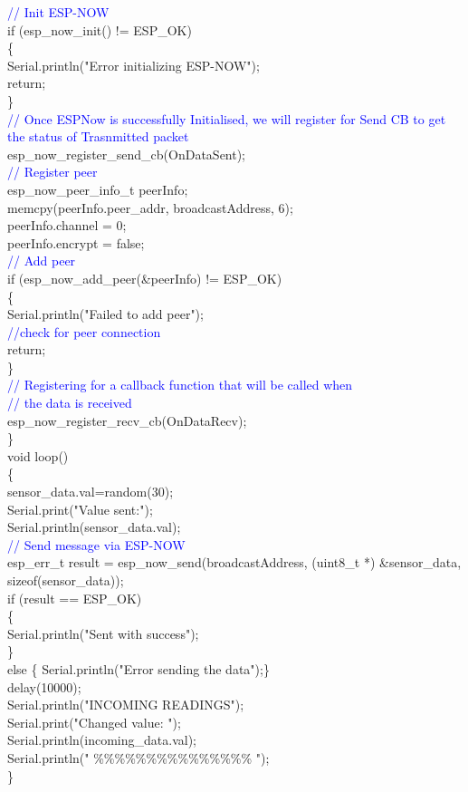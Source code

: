 \documentclass[12pt,a4paper]{article}
\begin{document}
  \textcolor{blue}{// Init ESP-NOW}\\
  if (esp\_now\_init() != ESP\_OK)\\
  \{\\
    Serial.println("Error initializing ESP-NOW");\\
    return;\\
  \}\\
  \textcolor{blue}{// Once ESPNow is successfully Initialised, we will register for Send CB to get the status of Trasnmitted packet}\\
  esp\_now\_register\_send\_cb(OnDataSent);\\
  \textcolor{blue}{// Register peer}\\
  esp\_now\_peer\_info\_t peerInfo;\\
  memcpy(peerInfo.peer\_addr, broadcastAddress, 6);\\
  peerInfo.channel = 0; \\
  peerInfo.encrypt = false;\\
  \textcolor{blue}{// Add peer}\\      
  if (esp\_now\_add\_peer(\&peerInfo) != ESP\_OK)\\
  \{\\ 
    Serial.println("Failed to add peer");\\
    \textcolor{blue}{//check for peer connection}\\
    return;\\
  \}\\
  \textcolor{blue}{// Registering for a callback function that will be called when \\// the data is received}\\
  esp\_now\_register\_recv\_cb(OnDataRecv);\\
\}\\[15pt]
 
void loop() \\
\{\\  
sensor\_data.val=random(30);\\
  Serial.print("Value sent:");\\
  Serial.println(sensor\_data.val);\\
 \textcolor{blue}{ // Send message via ESP-NOW}\\
  esp\_err\_t result = esp\_now\_send(broadcastAddress, (uint8\_t *) \&sensor\_data, sizeof(sensor\_data));\\
   
  if (result == ESP\_OK) \\
  \{\\
    Serial.println("Sent with success");\\
  \}\\
  else \{ Serial.println("Error sending the data");\}\\
  delay(10000);\\
  Serial.println("INCOMING READINGS");\\
  Serial.print("Changed value: ");\\
  Serial.println(incoming\_data.val);\\
  Serial.println(" \%\%\%\%\%\%\%\%\%\%\%\%\%\%\% ");\\
\}
\end{document}
